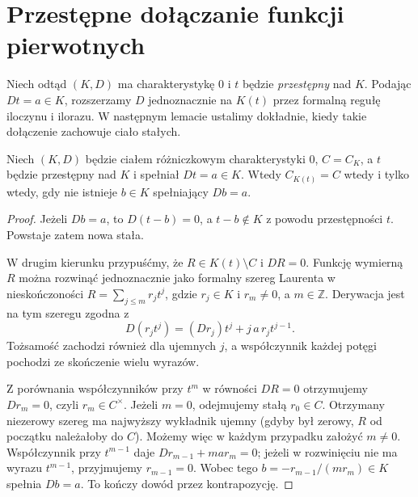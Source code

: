 \section{Przestępne dołączanie funkcji pierwotnych}

Niech odtąd $(K,D)$ ma charakterystykę $0$ i
$t$ będzie \emph{przestępny} nad $K$.
Podając $Dt=a\in K$, rozszerzamy $D$ jednoznacznie
na $K(t)$ przez formalną regułę iloczynu i ilorazu.
W następnym lemacie ustalimy dokładnie, kiedy
takie dołączenie zachowuje ciało stałych.

\begin{lemat}
\label{aa:lem:primitive-extension-constants}
Niech $(K,D)$ będzie ciałem różniczkowym
charakterystyki $0$, $C=C_K$, a $t$ będzie
przestępny nad $K$ i spełniał $Dt=a\in K$.
Wtedy $C_{K(t)}=C$ wtedy i tylko wtedy,
gdy nie istnieje $b\in K$ spełniający $Db=a$.
\end{lemat}
\begin{proof}
Jeżeli $Db=a$, to $D(t-b)=0$, a
$t-b\notin K$ z powodu przestępności $t$.
Powstaje zatem nowa stała.

W drugim kierunku przypuśćmy, że
$R\in K(t)\setminus C$ i $DR=0$.
Funkcję wymierną $R$ można rozwinąć
jednoznacznie jako formalny szereg Laurenta
w nieskończoności
$R=\sum_{j\le m}r_jt^j$, gdzie $r_j\in K$
i $r_m\ne0$, a $m\in\mathbb Z$.
Derywacja jest na tym szeregu zgodna z
\[
D(r_jt^j)=(Dr_j)t^j+j\,a\,r_jt^{j-1}.
\]
Tożsamość zachodzi również dla ujemnych $j$,
a współczynnik każdej potęgi pochodzi ze
skończenie wielu wyrazów.

Z porównania współczynników przy $t^m$
w równości $DR=0$ otrzymujemy $Dr_m=0$,
czyli $r_m\in C^\times$.
Jeżeli $m=0$, odejmujemy stałą $r_0\in C$.
Otrzymany niezerowy szereg ma najwyższy
wykładnik ujemny (gdyby był zerowy,
$R$ od początku należałoby do $C$).
Możemy więc w każdym przypadku założyć $m\ne0$.
Współczynnik przy $t^{m-1}$ daje
$Dr_{m-1}+ma r_m=0$; jeżeli w rozwinięciu
nie ma wyrazu $t^{m-1}$, przyjmujemy
$r_{m-1}=0$. Wobec tego
$b=-r_{m-1}/(mr_m)\in K$ spełnia $Db=a$.
To kończy dowód przez kontrapozycję.
\end{proof}

